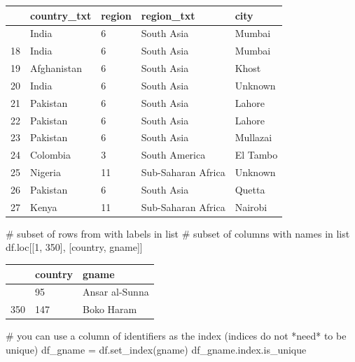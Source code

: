 \documentclass[
  letterpaper,
  DIV=11,
  numbers=noendperiod]{scrreprt}
\newenvironment{Shaded}{\begin{snugshade}}{\end{snugshade}}
\newcommand{\CommentTok}[1]{\textcolor[rgb]{0.37,0.37,0.37}{#1}}
\newcommand{\DecValTok}[1]{\textcolor[rgb]{0.68,0.00,0.00}{#1}}
\newcommand{\NormalTok}[1]{\textcolor[rgb]{0.00,0.23,0.31}{#1}}
\newcommand{\OperatorTok}[1]{\textcolor[rgb]{0.37,0.37,0.37}{#1}}
\newcommand{\StringTok}[1]{\textcolor[rgb]{0.13,0.47,0.30}{#1}}
\begin{document}
\begin{longtable}[]{@{}lllll@{}}
\toprule\noalign{}
& country\_txt & region & region\_txt & city \\
\midrule\noalign{}
\endhead
\bottomrule\noalign{}
\endlastfoot
17 & India & 6 & South Asia & Mumbai \\
18 & India & 6 & South Asia & Mumbai \\
19 & Afghanistan & 6 & South Asia & Khost \\
20 & India & 6 & South Asia & Unknown \\
21 & Pakistan & 6 & South Asia & Lahore \\
22 & Pakistan & 6 & South Asia & Lahore \\
23 & Pakistan & 6 & South Asia & Mullazai \\
24 & Colombia & 3 & South America & El Tambo \\
25 & Nigeria & 11 & Sub-Saharan Africa & Unknown \\
26 & Pakistan & 6 & South Asia & Quetta \\
27 & Kenya & 11 & Sub-Saharan Africa & Nairobi \\
\end{longtable}

\begin{Shaded}
\begin{Highlighting}[]
\CommentTok{\# subset of rows from with labels in list}
\CommentTok{\# subset of columns with names in list}
\NormalTok{df.loc[[}\DecValTok{1}\NormalTok{, }\DecValTok{350}\NormalTok{], [}\StringTok{\textquotesingle{}country\textquotesingle{}}\NormalTok{, }\StringTok{\textquotesingle{}gname\textquotesingle{}}\NormalTok{]]}
\end{Highlighting}
\end{Shaded}

\begin{longtable}[]{@{}lll@{}}
\toprule\noalign{}
& country & gname \\
\midrule\noalign{}
\endhead
\bottomrule\noalign{}
\endlastfoot
1 & 95 & Ansar al-Sunna \\
350 & 147 & Boko Haram \\
\end{longtable}

\begin{Shaded}
\begin{Highlighting}[]
\CommentTok{\# you can use a column of identifiers as the index (indices do not *need* to be unique)}
\NormalTok{df\_gname }\OperatorTok{=}\NormalTok{ df.set\_index(}\StringTok{\textquotesingle{}gname\textquotesingle{}}\NormalTok{)}
\NormalTok{df\_gname.index.is\_unique}
\end{Highlighting}
\end{Shaded}
\end{document}
